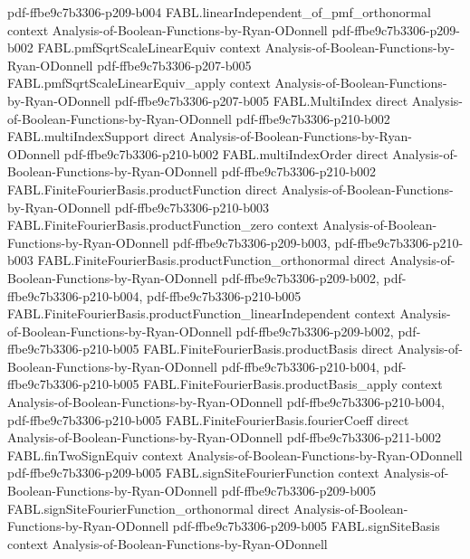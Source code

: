 \begin{theorem}
  {pdf-ffbe9c7b3306-p209-b004}
\proofstep
  {FABL.linearIndependent_of_pmf_orthonormal}
  {context}
  {Analysis-of-Boolean-Functions-by-Ryan-ODonnell}
  {pdf-ffbe9c7b3306-p209-b002}
\proofstep
  {FABL.pmfSqrtScaleLinearEquiv}
  {context}
  {Analysis-of-Boolean-Functions-by-Ryan-ODonnell}
  {pdf-ffbe9c7b3306-p207-b005}
\proofstep
  {FABL.pmfSqrtScaleLinearEquiv_apply}
  {context}
  {Analysis-of-Boolean-Functions-by-Ryan-ODonnell}
  {pdf-ffbe9c7b3306-p207-b005}
\proofstep
  {FABL.MultiIndex}
  {direct}
  {Analysis-of-Boolean-Functions-by-Ryan-ODonnell}
  {pdf-ffbe9c7b3306-p210-b002}
\proofstep
  {FABL.multiIndexSupport}
  {direct}
  {Analysis-of-Boolean-Functions-by-Ryan-ODonnell}
  {pdf-ffbe9c7b3306-p210-b002}
\proofstep
  {FABL.multiIndexOrder}
  {direct}
  {Analysis-of-Boolean-Functions-by-Ryan-ODonnell}
  {pdf-ffbe9c7b3306-p210-b002}
\proofstep
  {FABL.FiniteFourierBasis.productFunction}
  {direct}
  {Analysis-of-Boolean-Functions-by-Ryan-ODonnell}
  {pdf-ffbe9c7b3306-p210-b003}
\proofstep
  {FABL.FiniteFourierBasis.productFunction_zero}
  {context}
  {Analysis-of-Boolean-Functions-by-Ryan-ODonnell}
  {pdf-ffbe9c7b3306-p209-b003,
    pdf-ffbe9c7b3306-p210-b003}
\proofstep
  {FABL.FiniteFourierBasis.productFunction_orthonormal}
  {direct}
  {Analysis-of-Boolean-Functions-by-Ryan-ODonnell}
  {pdf-ffbe9c7b3306-p209-b002,
    pdf-ffbe9c7b3306-p210-b004,
    pdf-ffbe9c7b3306-p210-b005}
\proofstep
  {FABL.FiniteFourierBasis.productFunction_linearIndependent}
  {context}
  {Analysis-of-Boolean-Functions-by-Ryan-ODonnell}
  {pdf-ffbe9c7b3306-p209-b002,
    pdf-ffbe9c7b3306-p210-b005}
\proofstep
  {FABL.FiniteFourierBasis.productBasis}
  {direct}
  {Analysis-of-Boolean-Functions-by-Ryan-ODonnell}
  {pdf-ffbe9c7b3306-p210-b004,
    pdf-ffbe9c7b3306-p210-b005}
\proofstep
  {FABL.FiniteFourierBasis.productBasis_apply}
  {context}
  {Analysis-of-Boolean-Functions-by-Ryan-ODonnell}
  {pdf-ffbe9c7b3306-p210-b004,
    pdf-ffbe9c7b3306-p210-b005}
\proofstep
  {FABL.FiniteFourierBasis.fourierCoeff}
  {direct}
  {Analysis-of-Boolean-Functions-by-Ryan-ODonnell}
  {pdf-ffbe9c7b3306-p211-b002}
\proofstep
  {FABL.finTwoSignEquiv}
  {context}
  {Analysis-of-Boolean-Functions-by-Ryan-ODonnell}
  {pdf-ffbe9c7b3306-p209-b005}
\proofstep
  {FABL.signSiteFourierFunction}
  {context}
  {Analysis-of-Boolean-Functions-by-Ryan-ODonnell}
  {pdf-ffbe9c7b3306-p209-b005}
\proofstep
  {FABL.signSiteFourierFunction_orthonormal}
  {direct}
  {Analysis-of-Boolean-Functions-by-Ryan-ODonnell}
  {pdf-ffbe9c7b3306-p209-b005}
\proofstep
  {FABL.signSiteBasis}
  {context}
  {Analysis-of-Boolean-Functions-by-Ryan-ODonnell}

\end{theorem}
